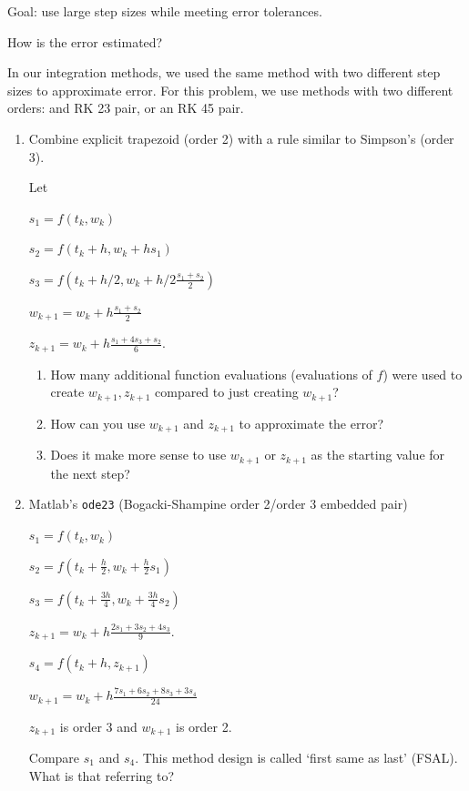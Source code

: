 \documentclass[12pt,letterpaper,noanswers]{exam}
\begin{document}
Goal: use large step sizes while meeting error tolerances.

How is the error estimated?

In our integration methods, we used the same method with two different step sizes to approximate error.  For this problem, we use methods with two different orders: and RK 23 pair, or an RK 45 pair.

\begin{enumerate}[resume]
\item Combine explicit trapezoid (order 2) with a rule similar to Simpson's (order 3).

Let

$s_1 = f(t_k,w_k)$

$s_2 = f(t_k + h, w_k + hs_1)$

$s_3 = f\left(t_k+ h/2, w_k + h/2\frac{s_1+s_2}{2}\right)$

$w_{k+1} = w_k + h\frac{s_1+s_2}{2}$

$z_{k+1} = w_k + h\frac{s_1+4s_3+s_2}{6}$.

\begin{enumerate}
\item How many additional function evaluations (evaluations of $f$) were used to create $w_{k+1}, z_{k+1}$ compared to just creating $w_{k+1}$?

\item How can you use $w_{k+1}$ and $z_{k+1}$ to approximate the error?

\item Does it make more sense to use $w_{k+1}$ or $z_{k+1}$ as the starting value for the next step?
\end{enumerate}
\item Matlab's \texttt{ode23} (Bogacki-Shampine order 2/order 3 embedded pair)

$s_1 = f(t_k,w_k)$

$s_2 = f(t_k + \frac{h}{2}, w_k + \frac{h}{2}s_1)$

$s_3 = f(t_k + \frac{3h}{4}, w_k + \frac{3h}{4}s_2)$

$z_{k+1} = w_k + h\frac{2s_1+3s_2+4s_3}{9}$.

$s_4 = f(t_k+ h, z_{k+1})$

$w_{k+1} = w_k + h\frac{7s_1+6s_2+8s_3+3s_4}{24}$

$z_{k+1}$ is order 3 and $w_{k+1}$ is order 2.

Compare $s_1$ and $s_4$.  This method design is called `first same as last' (FSAL).  What is that referring to?

\end{enumerate}
\end{document}
